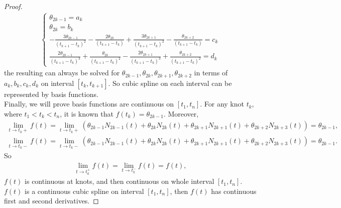 \begin{proof}
\begin{align*}
\begin{cases}
\theta_{2k-1}=a_k\\
\theta_{2k}=b_k\\
-\frac{3\theta_{2k-1}}{(t_{k+1}-t_{k})^2} -\frac{2\theta_{2k}}{(t_{k+1}-t_{k})} +\frac{3\theta_{2k+1}}{(t_{k+1}-t_{k})^2} - \frac{\theta_{2k+2}}{(t_{k+1}-t_{k})}=c_k\\
\frac{2\theta_{2k-1}}{(t_{k+1}-t_{k})^3} +\frac{\theta_{2k}}{(t_{k+1}-t_{k})^2} -\frac{2\theta_{2k+1}}{(t_{k+1}-t_{k})^3} +\frac{\theta_{2k+2}}{(t_{k+1}-t_{k})^2}=d_k
\end{cases}
\end{align*}
the resulting can always be solved for $\theta_{2k-1}, \theta_{2k},\theta_{2k+1},\theta_{2k+2}$ in terms of $a_k,b_k,c_k,d_k$ on interval $[t_k, t_{k+1}]$. So cubic spline on each interval can be represented by basis functions. \\

Finally, we will prove basis functions are continuous on $[t_1, t_n]$. For any knot $t_k$, where $t_1< t_k <t_n$, it is known that $f(t_k)=\theta_{2k-1}$. Moreover, 
\begin{align*}
\lim\limits_{t\rightarrow t_k+} f(t) = \lim\limits_{t\rightarrow t_k+} (\theta_{2k-1}N_{2k-1}(t)+\theta_{2k}N_{2k}(t)+\theta_{2k+1}N_{2k+1}(t)+\theta_{2k+2}N_{2k+3}(t))=\theta_{2k-1},\\
\lim\limits_{t\rightarrow t_k-} f(t) = \lim\limits_{t\rightarrow t_k-} (\theta_{2k-1}N_{2k-1}(t)+\theta_{2k}N_{2k}(t)+\theta_{2k+1}N_{2k+1}(t)+\theta_{2k+2}N_{2k+3}(t))=\theta_{2k-1}.
\end{align*}
So
\begin{align*}
\lim\limits_{t\rightarrow t_k^+} f(t) =\lim\limits_{t\rightarrow t_k^-} f(t) =f(t),
\end{align*}
$f(t)$ is continuous at knots, and then continuous on whole interval $[t_1,t_n]$.
$f(t)$ is a continuous cubic spline on interval $[t_1,t_n]$, then $f(t)$ has continuous first and second derivatives.
\end{proof}

